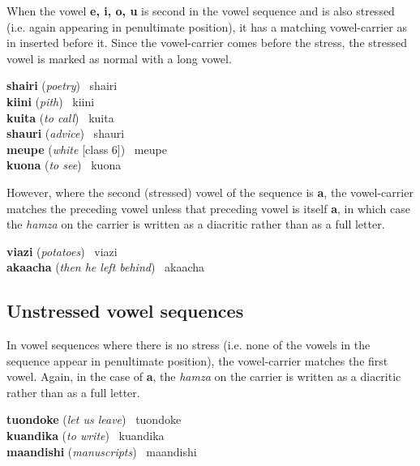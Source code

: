 When the vowel \textbf{e, i, o, u} is second in the vowel sequence and is also stressed (i.e. again appearing in penultimate position), it has a matching vowel-carrier as in  inserted before it.  Since the vowel-carrier comes before the stress, the stressed vowel is marked as normal with a long vowel.

\hangindent=3cm
\textbf{shairi} (\textit{poetry}) \textrightarrow\ shairi \textrightarrow\  \\
\textbf{kiini} (\textit{pith}) \textrightarrow\ kiini \textrightarrow\  \\
\textbf{kuita} (\textit{to call}) \textrightarrow\ kuita \textrightarrow\  \\
\textbf{shauri} (\textit{advice}) \textrightarrow\ shauri \textrightarrow\  \\
\textbf{meupe} (\textit{white} [class 6]) \textrightarrow\ meupe \textrightarrow\  \\
\textbf{kuona} (\textit{to see}) \textrightarrow\ kuona \textrightarrow\ 

However, where the second (stressed) vowel of the sequence is \textbf{a}, the vowel-carrier matches the preceding vowel unless that preceding vowel is itself \textbf{a}, in which case the \textit{hamza} on the carrier is written as a diacritic rather than as a full letter.

\hangindent=3cm
\textbf{viazi} (\textit{potatoes}) \textrightarrow\ viazi \textrightarrow\  \\
\textbf{akaacha} (\textit{then he left behind}) \textrightarrow\ akaacha \textrightarrow\ 

\subsection{Unstressed vowel sequences}

In vowel sequences where there is no stress (i.e. none of the vowels in the sequence appear in penultimate position), the vowel-carrier matches the first vowel.  Again, in the case of \textbf{a}, the \textit{hamza} on the carrier is written as a diacritic rather than as a full letter.

\hangindent=3cm
\textbf{tuondoke} (\textit{let us leave}) \textrightarrow\ tuondoke \textrightarrow\  \\
\textbf{kuandika} (\textit{to write}) \textrightarrow\ kuandika \textrightarrow\  \\
\textbf{maandishi} (\textit{manuscripts}) \textrightarrow\ maandishi \textrightarrow\  \\

